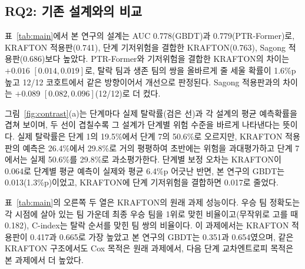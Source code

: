 \subsection{RQ2: 기존 설계와의 비교}
\label{sec:results:rq2}

표~\ref{tab:main}에서 본 연구의 설계는 AUC 0.778(GBDT)과 0.779(PTR-Former)로, KRAFTON 적용판(0.741), 단계 기저위험을 결합한 KRAFTON(0.763), Sagong 적용판(0.686)보다 높았다.
PTR-Former와 기저위험을 결합한 KRAFTON의 차이는 $+0.016$ $[0.014, 0.019]$로, 탈락 팀과 생존 팀의 쌍을 올바르게 줄 세울 확률이 1.6\%p 높고 12/12 코호트에서 같은 방향이어서 개선으로 판정된다.
Sagong 적용판과의 차이는 $+0.089$ $[0.082, 0.096]$(12/12)로 더 컸다.

그림~\ref{fig:contrast}(a)는  단계마다 실제 탈락률(검은 선)과 각 설계의 평균 예측확률을 겹쳐 보이며, 두 선이 겹칠수록 그 설계가 단계별 위험 수준을 바르게 나타낸다는 뜻이다.
실제 탈락률은 단계 1의 19.5\%에서 단계 7의 50.6\%로 오르지만, KRAFTON 적용판의 예측은 26.4\%에서 29.8\%로 거의 평평하여 초반에는 위험을 과대평가하고 단계 7에서는 실제 50.6\%를 29.8\%로 과소평가한다.
단계별 보정 오차는 KRAFTON이 0.064로 단계별 평균 예측이 실제와 평균 6.4\%p 어긋난 반면, 본 연구의 GBDT는 0.013(1.3\%p)이었고, KRAFTON에 단계 기저위험을 결합하면 0.017로 줄었다.


표~\ref{tab:main}의 오른쪽 두 열은 KRAFTON의 원래 과제 성능이다.
우승 팀 정확도는 각 시점에 살아 있는 팀 가운데 최종 우승 팀을 1위로 맞힌 비율이고(무작위로 고를 때 0.182), C-index는 탈락 순서를 맞힌 팀 쌍의 비율이다.
이 과제에서는 KRAFTON 적용판이 0.417과 0.665로 가장 높았고 본 연구의 GBDT는 0.351과 0.654였으며, 같은 KRAFTON 구조에서도 Cox 목적은 원래 과제에서, 다음 단계 교차엔트로피 목적은 본 과제에서 더 높았다.


